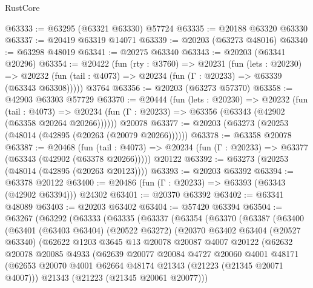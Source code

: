 \begin{lexlean}{RustCore}
\begin{coremodule}
@63333 := @63295 (@63321 @63330) @57724
@63335 := @20188 @63320 @63330
@63337 := @20419 @63319 @14071
@63339 := @20203 (@63273 @48016)
@63340 := @63298 @48019
@63341 := @20275 @63340
@63343 := @20203 (@63341 @20296)
@63354 := @20422
    (fun (rty : @3760) =>
    @20231
      (fun (lets : @20230) =>
      @20232 (fun (tail : @4073) => @20234 (fun (Γ : @20233) => @63339 (@63343 @63308)))))
    @3764
@63356 := @20203 (@63273 @57370)
@63358 := @42903 @63303 @57729
@63370 := @20444
    (fun (lets : @20230) =>
    @20232
      (fun (tail : @4073) =>
      @20234 (fun (Γ : @20233) => @63356 (@63343 (@42902 (@63358 @20264 @20266))))))
    @20078
@63377 := @20203 (@63273 (@20253 (@48014 (@42895 (@20263 (@20079 @20266))))))
@63378 := @63358 @20078
@63387 := @20468
    (fun (tail : @4073) => @20234 (fun (Γ : @20233) => @63377 (@63343 (@42902 (@63378 @20266)))))
    @20122
@63392 := @63273 (@20253 (@48014 (@42895 (@20263 @20123))))
@63393 := @20203 @63392
@63394 := @63378 @20122
@63400 := @20486 (fun (Γ : @20233) => @63393 (@63343 (@42902 @63394))) @24302
@63401 := @20370 @63392
@63402 := @63341 @48089
@63403 := @20203 @63402
@63404 := @57420 @63394
@63504 := @63267
    (@63292
      (@63333
        (@63335
          (@63337
            (@63354
              (@63370
                (@63387
                  (@63400
                    (@63401
                      (@63403 @63404)
                      (@20522 @63272)
                      (@20370
                        @63402
                        @63404
                        (@20527 @63340)
                        (@62622
                          @1203
                          @3645
                          @13
                          @20078
                          @20087
                          @4007
                          @20122
                          (@62632
                            @20078
                            @20085
                            @4933
                            (@62639
                              @20077
                              @20084
                              @4727
                              @20060
                              @4001
                              @48171
                              (@62653
                                @20070
                                @4001
                                @62664
                                @48174
                                @21343
                                (@21223 (@21345 @20071 @4007)))
                              @21343
                              (@21223 (@21345 @20061 @20077)))

\end{coremodule}
\end{lexlean}
